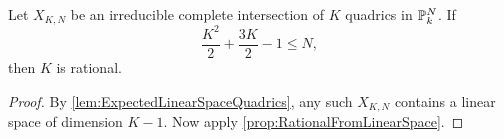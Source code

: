 \begin{theorem}
  \label{thm:QuadricRationalBound}
  Let $X_{K,N}$ be an irreducible complete intersection of $K$ quadrics in $\P_k^N$. If
\[ \frac{K^2}{2} + \frac{3K}{2} - 1 \leq N,\]
then $K$ is rational.
\end{theorem}
\begin{proof}
By \cref{lem:ExpectedLinearSpaceQuadrics}, any such $X_{K,N}$ contains a linear space of dimension $K-1$.
Now apply \cref{prop:RationalFromLinearSpace}.
\end{proof}



